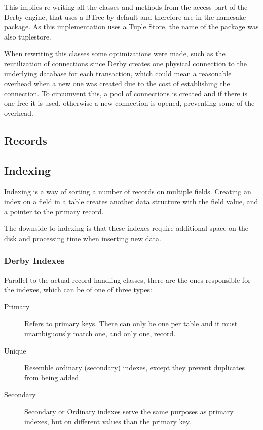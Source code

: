 This implies re-writing all the classes and methods from the access part of the Derby engine, that uses a BTree by default and therefore are in the namesake package. As this implementation uses a Tuple Store, the name of the package was also tuplestore.

When rewriting this classes some optimizations were made, such as the reutilization of connections since Derby creates one physical connection to the underlying database for each transaction, which could mean a reasonable overhead when a new one was created due to the cost of establishing the connection. To circumvent this, a pool of connections is created and if there is one free it is used, otherwise a new connection is opened, preventing some of the overhead. 

\subsection{Records}

\subsection{Indexing}
Indexing is a way of sorting a number of records on multiple fields. Creating an index on a field in a table creates another data structure with the field value, and a pointer to the primary record. 

The downside to indexing is that these indexes require additional space on the disk and processing time when inserting new data.

\subsubsection{Derby Indexes}
Parallel to the actual record handling classes, there are the ones responsible for the indexes, which can be of one of three types:

\begin{description}
	\item[Primary] Refers to primary keys. There can only be one per table and it must unambiguously match one, and only one, record.
	\item[Unique] Resemble ordinary (secondary) indexes, except they prevent duplicates from being added.
	\item[Secondary] Secondary or Ordinary indexes serve the same purposes as primary indexes, but on different values than the primary key.
\end{description} 

